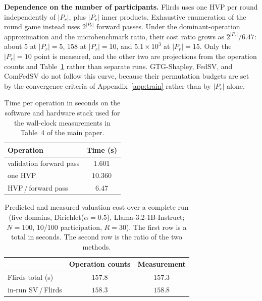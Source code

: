 \documentclass[letterpaper]{article} %
\theoremstyle{definition}
\begin{document}
\noindent\textbf{Dependence on the number of participants.} Flirds uses one HVP per
round independently of $|P_r|$, plus $|P_r|$ inner products. Exhaustive
enumeration of the round game instead uses $2^{|P_r|}$ forward passes. Under
the dominant-operation approximation and the microbenchmark ratio, their cost
ratio grows as $2^{|P_r|}/6.47$: about $5$
at $|P_r|{=}5$, $158$ at $|P_r|{=}10$, and $5.1\times10^3$ at $|P_r|{=}15$.
Only the $|P_r|{=}10$ point is measured, and the other two are projections
from the operation counts and Table~\ref{tab:microbench} rather than separate
runs. GTG-Shapley, FedSV, and ComFedSV do not follow this curve, because their
permutation budgets are set by the convergence criteria of
Appendix~\ref{app:train} rather than by $|P_r|$ alone.

\begin{table}[t]
\centering
\small
\setlength{\tabcolsep}{4pt}
\begin{tabular}{lc}
\hline
Operation & Time (s) \\
\hline
validation forward pass & $1.601$ \\
one HVP & $10.360$ \\
\hline
HVP\,/\,forward pass & $6.47$ \\
\hline
\end{tabular}
\caption{Time per operation in seconds on the software and hardware stack used
for the wall-clock measurements in Table~4 of the main paper.}
\label{tab:microbench}
\end{table}

\begin{table}[t]
\centering
\small
\setlength{\tabcolsep}{4pt}
\begin{tabular}{lcc}
\hline
 & Operation counts & Measurement \\
\hline
Flirds total (s) & $157.8$ & $157.3$ \\
in-run SV\,/\,Flirds & $158.3$ & $158.8$ \\
\hline
\end{tabular}
\caption{Predicted and measured valuation cost over a complete
run (five domains, Dirichlet($\alpha{=}0.5$), Llama-3.2-1B-Instruct; $N{=}100$,
10/100 participation, $R{=}30$). The first row is a total in seconds. The
second row is the ratio of the two methods.}
\label{tab:cost-check}
\end{table}


\end{document}
